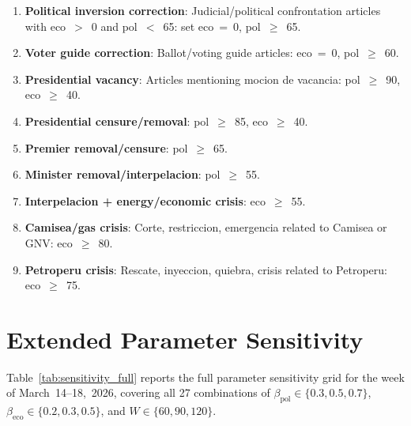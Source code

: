 \documentclass[12pt,a4paper]{article}
\begin{document}
\begin{enumerate}
  \item \textbf{Political inversion correction}: Judicial/political
    confrontation articles with eco~$>$~0 and pol~$<$~65: set eco~=~0,
    pol~$\geq$~65.
  \item \textbf{Voter guide correction}: Ballot/voting guide articles:
    eco~=~0, pol~$\geq$~60.
  \item \textbf{Presidential vacancy}: Articles mentioning mocion de
    vacancia: pol~$\geq$~90, eco~$\geq$~40.
  \item \textbf{Presidential censure/removal}: pol~$\geq$~85, eco~$\geq$~40.
  \item \textbf{Premier removal/censure}: pol~$\geq$~65.
  \item \textbf{Minister removal/interpelacion}: pol~$\geq$~55.
  \item \textbf{Interpelacion + energy/economic crisis}: eco~$\geq$~55.
  \item \textbf{Camisea/gas crisis}: Corte, restriccion, emergencia
    related to Camisea or GNV: eco~$\geq$~80.
  \item \textbf{Petroperu crisis}: Rescate, inyeccion, quiebra,
    crisis related to Petroperu: eco~$\geq$~75.
\end{enumerate}

\section{Extended Parameter Sensitivity}
\label{app:sensitivity_extended}

Table~\ref{tab:sensitivity_full} reports the full parameter sensitivity
grid for the week of March~14--18,~2026, covering all 27 combinations of
$\beta_{\text{pol}} \in \{0.3, 0.5, 0.7\}$,
$\beta_{\text{eco}} \in \{0.2, 0.3, 0.5\}$, and
$W \in \{60, 90, 120\}$.
\end{document}
